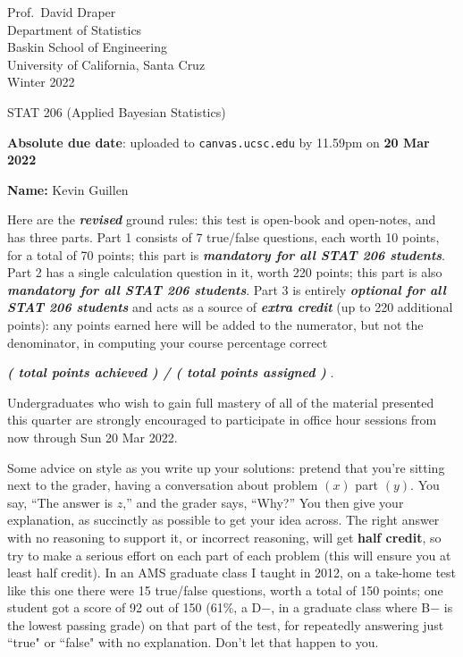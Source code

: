 \documentclass[12pt]{article}
\newcommand{\bi}[1]{\textbf{\textit{#1}}}
\begin{document}
\begin{flushleft}

Prof.~David Draper \\
Department of Statistics \\
Baskin School of Engineering \\
University of California, Santa Cruz \\
Winter 2022

\end{flushleft}

\Large

\begin{center}

STAT 206 (\textsf{Applied Bayesian Statistics})


\large

\textbf{Absolute due date}: uploaded to \texttt{canvas.ucsc.edu} by 11.59pm on \textbf{20 Mar 2022}

\end{center}


\normalsize
\textbf{Name:} Kevin Guillen


Here are the \bi{revised} ground rules: this test is open-book and open-notes, and has three parts. Part 1 consists of 7 true/false questions, each worth 10 points, for a total of 70 points; this part is \bi{mandatory for all STAT 206 students}. Part 2 has a single calculation question in it, worth 220 points; this part is also \bi{mandatory for all STAT 206 students}. Part 3 is entirely \bi{optional for all STAT 206 students} and acts as a source of \bi{extra credit} (up to 220 additional points): any points earned here will be added to the numerator, but not the denominator, in computing your course percentage correct 

\hspace*{0.5in}\bi{( total points achieved ) / ( total points assigned )} .

Undergraduates who wish to gain full mastery of all of the material presented this quarter are strongly encouraged to participate in office hour sessions from now through Sun 20 Mar 2022.

Some advice on style as you write up your solutions: pretend that you're sitting next to the grader, having a conversation about problem $( x )$ part $( y )$. You say, ``The answer is $z$,'' and the grader says, ``Why?'' You then give your explanation, as succinctly as possible to get your idea across. The right answer with no reasoning to support it, or incorrect reasoning, will get \textbf{half credit}, so try to make a serious effort on each part of each problem (this will ensure you at least half credit). In an AMS graduate class I taught in 2012, on a take-home test like this one there were 15 true/false questions, worth a total of 150 points; one student got a score of 92 out of 150 (61\%, a D$-$, in a graduate class where B$-$ is the lowest passing grade) on that part of the test, for repeatedly answering just ``true" or ``false" with no explanation. Don't let that happen to you.  
\end{document}
